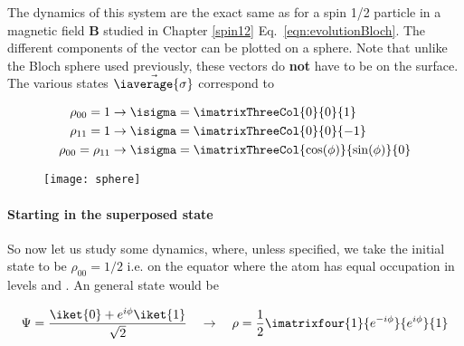   \noindent The  dynamics of this  system are the  exact same as  for a
  spin 1/2 particle  in a magnetic field \textbf{B}  studied in Chapter
  \ref{spin12}    Eq.~\eqref{eqn:evolutionBloch}.      The    different
  components of  the vector \isigma can  be plotted on a  sphere.  Note
  that  unlike  the Bloch  sphere  used  previously, these  vectors  do
  \textbf{not}  have  to  be  on   the  surface.   The  various  states
  $ \vec{\iaverage{\sigma}} $ correspond to

  \begin{align}
    \rho_{00}=1 & \rightarrow \isigma = \imatrixThreeCol{0}{0}{1}\\
    \rho_{11}=1 & \rightarrow \isigma = \imatrixThreeCol{0}{0}{-1}\\
    \rho_{00}=\rho_{11}&\rightarrow\isigma = \imatrixThreeCol{\cos(\phi)}{\sin(\phi)}{0}
  \end{align}

  \begin{figure}[h]
    \centering \texttt{[image: sphere]}
  \end{figure}

  \newpage

  \paragraph{Starting in the superposed state}

  So now let  us study some dynamics, where, unless  specified, we take
  the initial state to be $  \rho_{00}=1/2 $ i.e.  on the equator where
  the atom  has equal  occupation in levels   and  . An
  general state would be

 \[
   \Psi   =  \frac{\iket{0}+e^{i\phi}\iket{1}}{\sqrt{2}}   \quad  \rightarrow   \quad  \rho   =
   \frac{1}{2}\imatrixfour{1}{e^{-i\phi}}{e^{i\phi}}{1}
 \]

